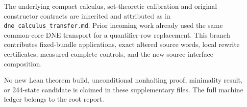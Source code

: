 The underlying compact calculus, set-theoretic calibration and original
constructor contracts are inherited and attributed as in
\nolinkurl{dne_calculus_transfer.md}. Prior incoming work already used
the same common-core DNE transport for a quantifier-row replacement.
This branch contributes fixed-bundle applications, exact altered source
words, local rewrite certificates, measured complete controls, and the
new source-interface composition.

No new Lean theorem build, unconditional nonhalting proof, minimality
result, or 244-state candidate is claimed in these supplementary files.
The full machine ledger belongs to the root report.
